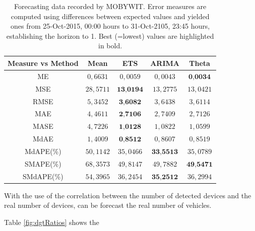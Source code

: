 \documentclass[preprint]{elsarticle}
\begin{document}
\begin{table}
\centering
\begin{tabular}{|c|c|c|c|c|}
\hline
Measure vs Method &Mean &ETS &ARIMA &Theta\\
\hline
ME &$0,6631$ & $0,0059$ & $0,0043$ & $\textbf{0,0034}$\\
MSE &$28,5711$ & $\textbf{13,0194}$ & $13,2775$ & $13,0421$\\
RMSE &$5,3452$ & $\textbf{3,6082}$ & $3,6438$ & $3,6114$\\
MAE &$4,4611$ & $\textbf{2,7106}$ & $2,7409$ & $2,7126$\\
MASE &$4,7226$ & $\textbf{1,0128}$ & $1,0822$ & $1,0599$\\
MdAE &$1,4009$ & $\textbf{0,8512}$ & $0,8607$ & $0,8519$\\
MdAPE(\%) &$50,1142$ & $35,0466$ & $\textbf{33,5513}$ & $35,0789$\\
 SMAPE(\%) &$68,3573$ & $49,8147$ & $49,7882$ & $\textbf{49,5471}$\\
 SMdAPE(\%) &$54,3965$ & $36,2454$ & $\textbf{35,2512}$ & $36,2994$\\
\hline
\end{tabular}
\caption{Forecasting data recorded by MOBYWIT. Error measures are computed using differences between expected values and yielded ones from 25-Oct-2015, 00:00 hours to 31-Oct-2105, 23:45 hours, establishing the horizon to 1. Best (=lowest) values are highlighted in bold.}
\label{tab:forecasting}
\end{table}

With the use of the correlation between the number of detected devices and the real number of devices, can be forecast the real number of vehicles.

Table \ref{fig:dgtRatios} shows the 


\begin{table}[htb]
\centering
{}
\caption{Forecasting data recorded by MOBYWIT with Median Ratio By Hour conversion. Error measures are computed using differences between expected values and yielded by DGT from 25-Oct-2015, 00:00 hours to 31-Oct-2105, 23:45 hours, establishing the horizon to 1. Best (=lowest) values are highlighted in bold.}
\label{tab:errorForecastingRatio}
\end{table}
\end{document}
